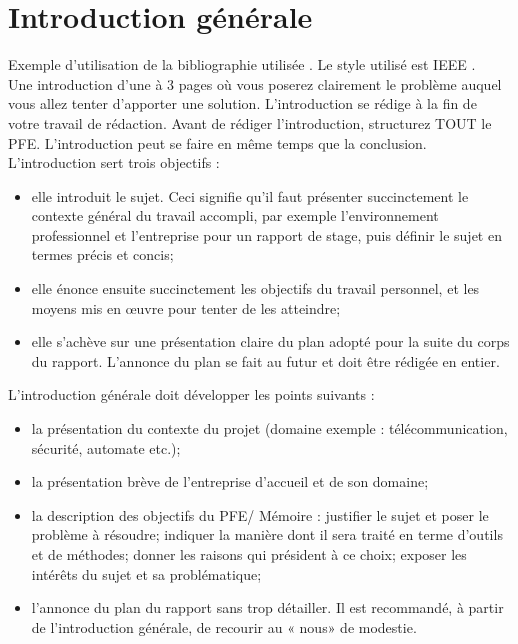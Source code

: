 \chapter*{Introduction générale}

Exemple d'utilisation de la bibliographie utilisée \cite{webArticle2}. Le style utilisé est IEEE \cite{webArticle1}.\\

Une introduction d’une à 3 pages où vous poserez clairement le problème auquel vous allez tenter d’apporter une solution. L’introduction se rédige à la fin de votre travail de rédaction. Avant de rédiger l’introduction, structurez TOUT le PFE. L’introduction peut se faire en même temps que la conclusion.\\

L’introduction sert trois objectifs :
\begin{itemize}
\item elle introduit le sujet. Ceci signifie qu’il faut présenter succinctement le contexte général du travail accompli, par exemple l’environnement professionnel et l’entreprise pour un rapport de stage, puis définir le sujet en termes précis et concis;
\item elle énonce ensuite succinctement les objectifs du travail personnel, et les moyens mis en œuvre pour tenter de les atteindre;
\item elle s’achève sur une présentation claire du plan adopté pour la suite du corps du rapport. L’annonce du plan se fait au futur et doit être rédigée en entier.
\end{itemize}

\null

L’introduction générale doit développer les points suivants :
\begin{itemize}
\item la présentation du contexte du projet (domaine exemple : télécommunication, sécurité, automate etc.);
\item la présentation brève de l’entreprise d’accueil et de son domaine;
\item la description des objectifs du PFE/ Mémoire : justifier le sujet et poser le problème à résoudre; indiquer  la manière dont il sera traité en terme d’outils et de méthodes; donner les raisons qui président à ce choix; exposer les intérêts du sujet et sa problématique;
\item l’annonce du plan du rapport sans trop détailler.  Il est recommandé, à partir de l’introduction générale, de recourir au « nous» de modestie.
\end{itemize}
